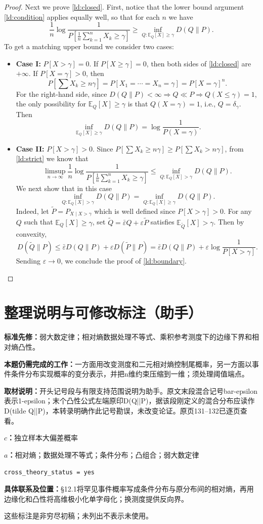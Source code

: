 \documentclass[UTF8,11pt,a4paper]{ctexart}
\theoremstyle{definition}\newtheorem*{definition}{Definition}
\theoremstyle{remark}\newtheorem*{remark}{Remark}
\newcommand{\E}{\mathbb E}
\newcommand{\eps}{\varepsilon}
\begin{document}
\begin{proof}
Next we prove \eqref{ld:closed}. First, notice that the lower bound argument \eqref{ld:condition} applies equally well, so that for each $n$ we have
\[
\frac1n\log\frac1{P[\frac1n\sum_{k=1}^nX_k\ge\gamma]}
\ge\inf_{Q:\E_Q[X]\ge\gamma}D(Q\|P).
\]
To get a matching upper bound we consider two cases:
\begin{itemize}
\item \textbf{Case I:} $P[X>\gamma]=0$. If $P[X\ge\gamma]=0$, then both sides of \eqref{ld:closed} are $+\infty$. If $P[X=\gamma]>0$, then
\[
P\left[\sum X_k\ge n\gamma\right]
=P[X_1=\cdots=X_n=\gamma]=P[X=\gamma]^n.
\]
For the right-hand side, since $D(Q\|P)<\infty\Rightarrow Q\ll P\Rightarrow Q(X\le\gamma)=1$, the only possibility for $\E_Q[X]\ge\gamma$ is that $Q(X=\gamma)=1$, i.e., $Q=\delta_\gamma$. Then
\[
\inf_{\E_Q[X]\ge\gamma}D(Q\|P)=\log\frac1{P(X=\gamma)}.
\]
\item \textbf{Case II:} $P[X>\gamma]>0$. Since $P[\sum X_k\ge n\gamma]\ge P[\sum X_k>n\gamma]$, from \eqref{ld:strict} we know that
\[
\limsup_{n\to\infty}\frac1n\log\frac1{P[\frac1n\sum_{k=1}^nX_k\ge\gamma]}
\le\inf_{Q:\E_Q[X]>\gamma}D(Q\|P).
\]
We next show that in this case
\begin{equation}\label{ld:boundary}
\inf_{Q:\E_Q[X]>\gamma}D(Q\|P)=\inf_{Q:\E_Q[X]\ge\gamma}D(Q\|P).
\end{equation}
Indeed, let $\widetilde P=P_{X\mid X>\gamma}$ which is well defined since $P[X>\gamma]>0$. For any $Q$ such that $\E_Q[X]\ge\gamma$, set $\widetilde Q=\bar\eps Q+\eps\widetilde P$ satisfies $\E_{\widetilde Q}[X]>\gamma$. Then by convexity,
\[
D(\widetilde Q\|P)\le\bar\eps D(Q\|P)+\eps D(\widetilde P\|P)
=\bar\eps D(Q\|P)+\eps\log\frac1{P[X>\gamma]}.
\]
Sending $\eps\to0$, we conclude the proof of \eqref{ld:boundary}.
\end{itemize}
\end{proof}

\section*{整理说明与可修改标注（助手）}
\textbf{标准先修：}弱大数定律；相对熵数据处理不等式、乘积参考测度下的边缘下界和相对熵凸性。

\textbf{本题仍需完成的工作：}一方面用改变测度和二元相对熵控制尾概率，另一方面以事件条件分布实现概率的变分表示，并把n维约束压缩到一维；须处理阈值端点。

\textbf{取材说明：}开头记号段与有限支持范围说明为助手。原文末段混合记号bar-epsilon表示1-epsilon；末个凸性公式左端原印D(Q||P)，据该段刚定义的混合分布应读作D(tilde Q||P)，本转录明确作此记号勘误，未改变论证。原页131--132已逐页查看。

\textbf{$c$：}独立样本大偏差概率

\textbf{$a$：}相对熵；数据处理不等式；条件分布；凸组合；弱大数定律

\texttt{cross\_theory\_status = yes}

\textbf{具体联系及位置：}§12.1将罕见事件概率写成条件分布与原分布间的相对熵，再用边缘化和凸性将高维极小化单字母化；换测度提供反向界。

这些标注是非穷尽初稿；未列出不表示未使用。
\end{document}
